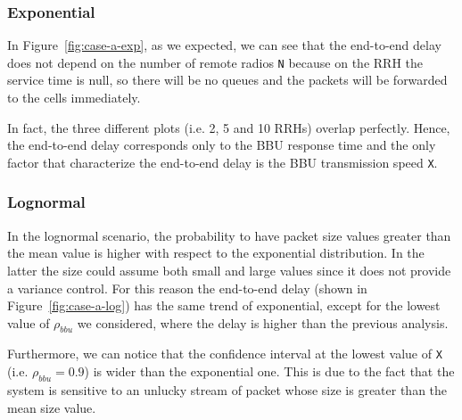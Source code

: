 \documentclass[11pt,a4paper,oneside, openright]{article}
\begin{document}
\subsubsection{Exponential}
In Figure~\ref{fig:case-a-exp}, as we expected, we can see that the end-to-end delay does not depend on the number of remote radios \texttt{N} because on the RRH the service time is null, so there will be no queues and the packets will be forwarded to the cells immediately.

In fact, the three different plots (i.e. 2, 5 and 10 RRHs) overlap perfectly.
Hence, the end-to-end delay corresponds only to the BBU response time and the only factor that characterize the end-to-end delay is the BBU transmission speed \texttt{X}.


\subsubsection{Lognormal}
In the lognormal scenario, the probability to have packet size values greater than the mean value is higher with respect to the exponential distribution. In the latter the size could assume both small and large values since it does not provide a variance control. For this reason the end-to-end delay (shown in Figure~\ref{fig:case-a-log}) has the same trend of exponential, except for the lowest value of $ \rho_{bbu} $ we considered, where the delay is higher than the previous analysis.

Furthermore, we can notice that the confidence interval at the lowest value of \texttt{X} (i.e. $\rho_{bbu} = 0.9$) is wider than the exponential one. This is due to the fact that the system is sensitive to an unlucky stream of packet whose size is greater than the mean size value.
\end{document}
